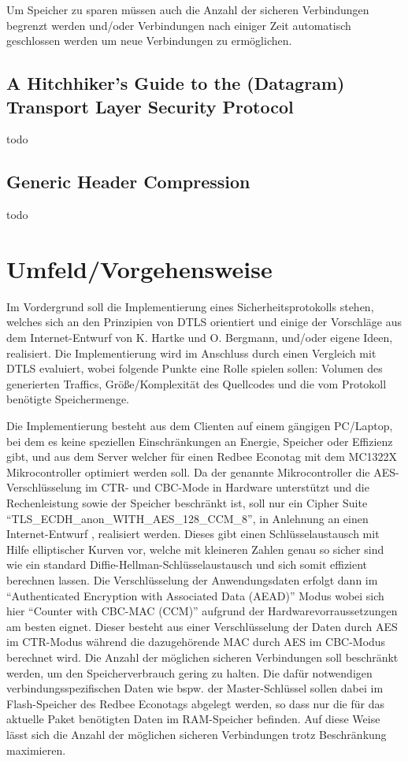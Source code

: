 \documentclass[a4paper,10pt]{report}
\begin{document}
Um Speicher zu sparen müssen auch die Anzahl der sicheren Verbindungen begrenzt werden und/oder Verbindungen nach einiger Zeit
automatisch geschlossen werden um neue Verbindungen zu ermöglichen.

\subsection{A Hitchhiker's Guide to the (Datagram) Transport Layer Security Protocol}
todo \cite{draftmintls}

\subsection{Generic Header Compression}
todo

\section{Umfeld/Vorgehensweise}
Im Vordergrund soll die Implementierung eines Sicherheitsprotokolls stehen, welches sich an den Prinzipien von DTLS orientiert
und einige der Vorschläge aus dem Internet-Entwurf von K. Hartke und O. Bergmann, und/oder eigene Ideen, realisiert.
Die Implementierung wird im Anschluss durch einen Vergleich mit DTLS evaluiert, wobei folgende Punkte eine Rolle spielen sollen:
Volumen des generierten Traffics, Größe/Komplexität des Quellcodes und die vom Protokoll benötigte Speichermenge.

Die Implementierung besteht aus dem Clienten auf einem gängigen PC/Laptop, bei dem es keine speziellen Einschränkungen an Energie,
Speicher oder Effizienz gibt, und aus dem Server welcher für einen Redbee Econotag \cite{econotag} mit dem MC1322X
Mikrocontroller \cite{mc1322x} optimiert werden soll. Da der genannte Mikrocontroller die AES-Verschlüsselung im CTR- und CBC-Mode
in Hardware unterstützt und die Rechenleistung sowie der Speicher beschränkt ist, soll nur ein Cipher Suite "`TLS\_ECDH\_anon\_WITH\_AES\_128\_CCM_8"',
in Anlehnung an einen Internet-Entwurf \cite{draftaesecc}, realisiert werden. Dieses gibt einen Schlüsselaustausch mit Hilfe elliptischer
Kurven vor, welche mit kleineren Zahlen genau so sicher sind wie ein standard Diffie-Hellman-Schlüsselaustausch und sich somit effizient berechnen
lassen. Die Verschlüsselung der Anwendungsdaten erfolgt dann im "`Authenticated Encryption with Associated Data (AEAD)"' Modus \cite{rfc5116}
wobei sich hier "`Counter with CBC-MAC (CCM)"' \cite{rfc3610} aufgrund der Hardwarevorraussetzungen am besten eignet. Dieser besteht
aus einer Verschlüsselung der Daten durch AES im CTR-Modus während die dazugehörende MAC durch AES im CBC-Modus berechnet wird.
Die Anzahl der möglichen sicheren Verbindungen soll beschränkt werden, um den Speicherverbrauch gering zu halten.
Die dafür notwendigen verbindungsspezifischen Daten wie bspw. der Master-Schlüssel sollen dabei im Flash-Speicher des Redbee Econotags
abgelegt werden, so dass nur die für das aktuelle Paket benötigten Daten im RAM-Speicher befinden. Auf diese Weise lässt sich
die Anzahl der möglichen sicheren Verbindungen trotz Beschränkung maximieren.
\end{document}
